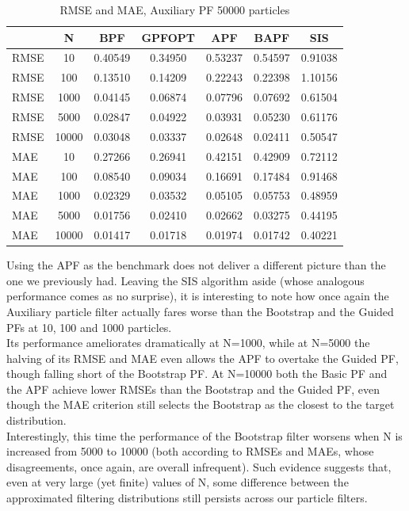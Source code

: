 \documentclass[
]{book}
\theoremstyle{break}
\theoremstyle{nonumberplain}
\begin{document}
\begin{longtable}[t]{lcccccc}
\caption{\label{tab:unnamed-chunk-38}RMSE and MAE, Auxiliary PF 50000 particles}\\
\toprule
  & N & BPF & GPFOPT & APF & BAPF & SIS\\
\midrule
RMSE & 10 & 0.40549 & 0.34950 & 0.53237 & 0.54597 & 0.91038\\
RMSE & 100 & 0.13510 & 0.14209 & 0.22243 & 0.22398 & 1.10156\\
RMSE & 1000 & 0.04145 & 0.06874 & 0.07796 & 0.07692 & 0.61504\\
RMSE & 5000 & 0.02847 & 0.04922 & 0.03931 & 0.05230 & 0.61176\\
RMSE & 10000 & 0.03048 & 0.03337 & 0.02648 & 0.02411 & 0.50547\\
\addlinespace
MAE & 10 & 0.27266 & 0.26941 & 0.42151 & 0.42909 & 0.72112\\
MAE & 100 & 0.08540 & 0.09034 & 0.16691 & 0.17484 & 0.91468\\
MAE & 1000 & 0.02329 & 0.03532 & 0.05105 & 0.05753 & 0.48959\\
MAE & 5000 & 0.01756 & 0.02410 & 0.02662 & 0.03275 & 0.44195\\
MAE & 10000 & 0.01417 & 0.01718 & 0.01974 & 0.01742 & 0.40221\\
\bottomrule
\end{longtable}

Using the APF as the benchmark does not deliver a different picture than
the one we previously had. Leaving the SIS algorithm aside (whose
analogous performance comes as no surprise), it is interesting to note
how once again the Auxiliary particle filter actually fares worse than
the Bootstrap and the Guided PFs at 10, 100 and 1000 particles.\\
Its performance ameliorates dramatically at N=1000, while at N=5000 the
halving of its RMSE and MAE even allows the APF to overtake the Guided
PF, though falling short of the Bootstrap PF. At N=10000 both the Basic
PF and the APF achieve lower RMSEs than the Bootstrap and the Guided PF,
even though the MAE criterion still selects the Bootstrap as the closest
to the target distribution.\\
Interestingly, this time the performance of the Bootstrap filter worsens
when N is increased from 5000 to 10000 (both according to RMSEs and
MAEs, whose disagreements, once again, are overall infrequent). Such
evidence suggests that, even at very large (yet finite) values of N,
some difference between the approximated filtering distributions still
persists across our particle filters.\\
\end{document}
